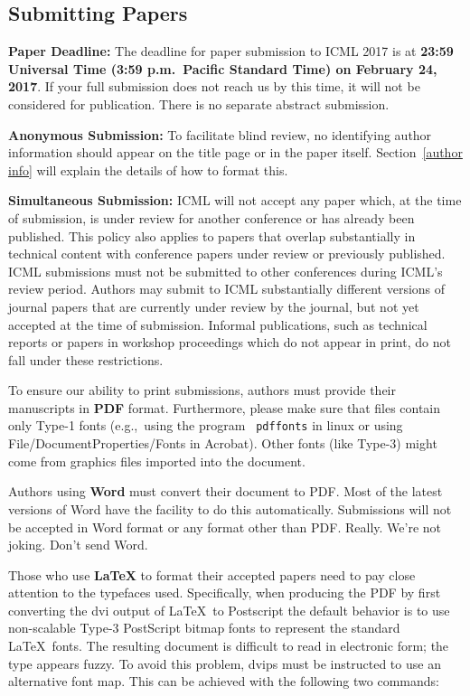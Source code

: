 \documentclass{article}
\begin{document}
\subsection{Submitting Papers}

{\bf Paper Deadline:} The deadline for paper submission to ICML 2017
is at \textbf{23:59 Universal Time (3:59 p.m.\ Pacific Standard Time) on February 24, 2017}.
If your full submission does not reach us by this time, it will 
not be considered for publication. There is no separate abstract submission.

{\bf Anonymous Submission:} To facilitate blind review, no identifying
author information should appear on the title page or in the paper
itself.  Section~\ref{author info} will explain the details of how to
format this.

{\bf Simultaneous Submission:} ICML will not accept any paper which,
at the time of submission, is under review for another conference or
has already been published. This policy also applies to papers that
overlap substantially in technical content with conference papers
under review or previously published. ICML submissions must not be
submitted to other conferences during ICML's review period. Authors
may submit to ICML substantially different versions of journal papers
that are currently under review by the journal, but not yet accepted
at the time of submission. Informal publications, such as technical
reports or papers in workshop proceedings which do not appear in
print, do not fall under these restrictions.

\medskip

To ensure our ability to print submissions, authors must provide their
manuscripts in \textbf{PDF} format.  Furthermore, please make sure
that files contain only Type-1 fonts (e.g.,~using the program {\tt
  pdffonts} in linux or using File/DocumentProperties/Fonts in
Acrobat).  Other fonts (like Type-3) might come from graphics files
imported into the document.

Authors using \textbf{Word} must convert their document to PDF.  Most
of the latest versions of Word have the facility to do this
automatically.  Submissions will not be accepted in Word format or any
format other than PDF. Really. We're not joking. Don't send Word.

Those who use \textbf{\LaTeX} to format their accepted papers need to pay close
attention to the typefaces used.  Specifically, when producing the PDF by first
converting the dvi output of \LaTeX\ to Postscript the default behavior is to
use non-scalable Type-3 PostScript bitmap fonts to represent the standard
\LaTeX\ fonts. The resulting document is difficult to read in electronic form;
the type appears fuzzy. To avoid this problem, dvips must be instructed to use
an alternative font map.  This can be achieved with the following two commands:
\end{document}
